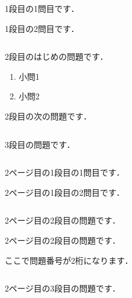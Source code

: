 \documentclass[b4paper,landscape,fleqn]{jarticle}
\begin{document}
%
%
\begin{sheet}
  \begin{column}
    \item 1段目の1問目です．\vspace{10cm}
    \item 1段目の2問目です．
  \end{column}%
  \begin{column}%
    \item 2段目のはじめの問題です．
        \begin{enumerate}
            \item 小問1 \vspace{4.5cm}
            \item 小問2 \vspace{4.5cm}
        \end{enumerate}
    \item 2段目の次の問題です．
  \end{column}%
  \begin{column}%
    \item 3段目の問題です．
  \end{column}%
\end{sheet}
\begin{sheet}%
  \begin{column}
    \item 2ページ目の1段目の1問目です．\vspace{10cm}
    \item 2ページ目の1段目の2問目です．
  \end{column}%
  \begin{column}%
    \item 2ページ目の2段目の問題です．\vspace{5cm}
    \item 2ページ目の2段目の問題です．\vspace{5cm}
    \item ここで問題番号が2桁になります．
  \end{column}%
  \begin{column}%
    \item 2ページ目の3段目の問題です．
  \end{column}%
\end{sheet}%
\end{document}
